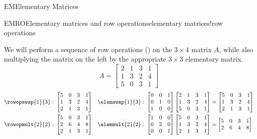 \begin{subsect}{EM}{Elementary Matrices}
\begin{example}{EMRO}{Elementary matrices and row operations}{elementary matrices!row operations}
\begin{para}We will perform a sequence of row operations () on the $3\times 4$ matrix $A$, while also multiplying the matrix on the left by the appropriate $3\times 3$ elementary matrix.
%
\begin{equation*}
A=
\begin{bmatrix}
2 & 1 & 3 & 1\\
1 & 3 & 2 & 4\\
5 & 0 & 3 & 1
\end{bmatrix}
\end{equation*}
%
\begin{align*}
\rowopswap{1}{3}:\ &
\begin{bmatrix}
5 & 0 & 3 & 1\\
1 & 3 & 2 & 4\\
2 & 1 & 3 & 1
\end{bmatrix}
&
\elemswap{1}{3}:\ &
\begin{bmatrix}
0 & 0 & 1\\
0 & 1 & 0\\
1 & 0 & 0
\end{bmatrix}
\begin{bmatrix}
2 & 1 & 3 & 1\\
1 & 3 & 2 & 4\\
5 & 0 & 3 & 1
\end{bmatrix}
=
\begin{bmatrix}
5 & 0 & 3 & 1\\
1 & 3 & 2 & 4\\
2 & 1 & 3 & 1
\end{bmatrix}\\
%
%
\rowopmult{2}{2}:\ &
\begin{bmatrix}
5 & 0 & 3 & 1\\
2 & 6 & 4 & 8\\
2 & 1 & 3 & 1
\end{bmatrix}
&
\elemmult{2}{2}:\ &
\begin{bmatrix}
1 & 0 & 0\\
0 & 2 & 0\\
0 & 0 & 1
\end{bmatrix}
\begin{bmatrix}
5 & 0 & 3 & 1\\
1 & 3 & 2 & 4\\
2 & 1 & 3 & 1
\end{bmatrix}
=
\begin{bmatrix}
5 & 0 & 3 & 1\\
2 & 6 & 4 & 8\\

\end{bmatrix}
\end{align*}
\end{para}
\end{example}
\end{subsect}
